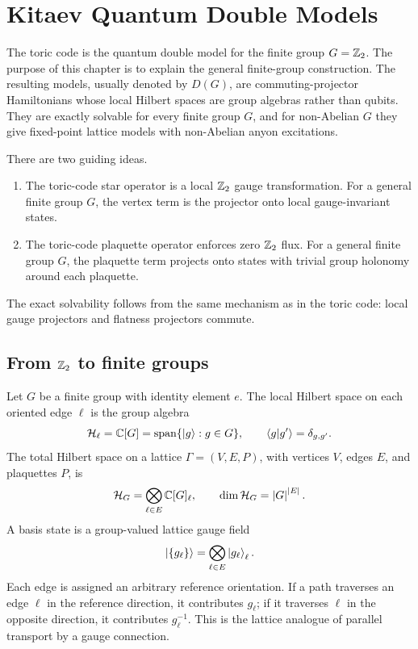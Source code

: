 \chapter{Kitaev Quantum Double Models}
\label{chap:kitaev-quantum-double-models}

The toric code is the quantum double model for the finite group
\(G=\mathbb{Z}_2\).  The purpose of this chapter is to explain the general finite-group construction.  The resulting models, usually denoted by \(D(G)\), are
commuting-projector Hamiltonians whose local Hilbert spaces are group algebras
rather than qubits.  They are exactly solvable for every finite group \(G\), and
for non-Abelian \(G\) they give fixed-point lattice models with non-Abelian
anyon excitations.

There are two guiding ideas.
\begin{enumerate}[label=(\roman*)]
    \item The toric-code star operator is a local \(\mathbb{Z}_2\) gauge
    transformation.  For a general finite group \(G\), the vertex term is the
    projector onto local gauge-invariant states.
    \item The toric-code plaquette operator enforces zero \(\mathbb{Z}_2\) flux.  For a
    general finite group \(G\), the plaquette term projects onto states with
    trivial group holonomy around each plaquette.
\end{enumerate}
The exact solvability follows from the same mechanism as in the toric code:
local gauge projectors and flatness projectors commute.

\section{From \texorpdfstring{\(\mathbb{Z}_2\)}{Z2} to finite groups}
\label{sec:quantum-double-from-z2-to-g}

Let \(G\) be a finite group with identity element \(e\).  The local Hilbert
space on each oriented edge \(\ell\) is the group algebra
\begin{equation}
\label{eq:edge-hilbert-group-algebra}
    \mathcal{H}_{\ell}=\mathbb{C}[G]
    =\operatorname{span}\{\left|g\right\rangle:g\in G\},
    \qquad
    \left\langle g\middle|g'\right\rangle=\delta_{g,g'} .
\end{equation}
The total Hilbert space on a lattice \(\Gamma=(V,E,P)\), with vertices \(V\),
edges \(E\), and plaquettes \(P\), is
\begin{equation}
\label{eq:quantum-double-total-hilbert-space}
    \mathcal{H}_G=\bigotimes_{\ell\in E}\mathbb{C}[G]_{\ell},
    \qquad
    \dim \mathcal{H}_G=\left|G\right|^{\left|E\right|} .
\end{equation}
A basis state is a group-valued lattice gauge field
\begin{equation}
\label{eq:group-lattice-configuration}
    \left|\{g_{\ell}\}\right\rangle
    =\bigotimes_{\ell\in E}\left|g_{\ell}\right\rangle_{\ell} .
\end{equation}
Each edge is assigned an arbitrary reference orientation.  If a path traverses
an edge \(\ell\) in the reference direction, it contributes \(g_{\ell}\); if it
traverses \(\ell\) in the opposite direction, it contributes \(g_{\ell}^{-1}\).
This is the lattice analogue of parallel transport by a gauge connection.

